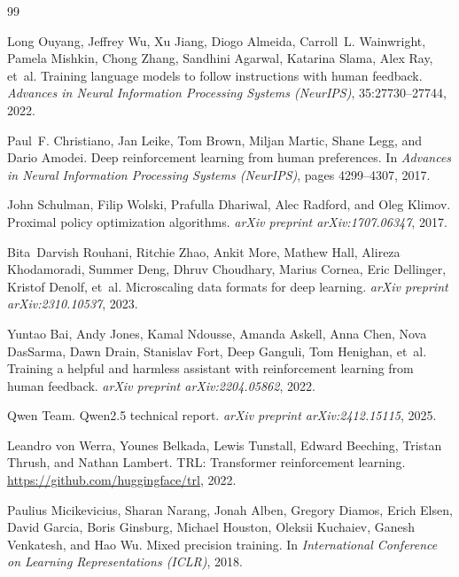 \documentclass[11pt,a4paper]{article}
\begin{document}

\begin{thebibliography}{99}

Long Ouyang, Jeffrey Wu, Xu Jiang, Diogo Almeida, Carroll~L. Wainwright, Pamela Mishkin, Chong Zhang, Sandhini Agarwal, Katarina Slama, Alex Ray, et~al.
Training language models to follow instructions with human feedback.
\emph{Advances in Neural Information Processing Systems (NeurIPS)}, 35:27730--27744, 2022.

Paul~F. Christiano, Jan Leike, Tom Brown, Miljan Martic, Shane Legg, and Dario Amodei.
Deep reinforcement learning from human preferences.
In \emph{Advances in Neural Information Processing Systems (NeurIPS)}, pages 4299--4307, 2017.

John Schulman, Filip Wolski, Prafulla Dhariwal, Alec Radford, and Oleg Klimov.
Proximal policy optimization algorithms.
\emph{arXiv preprint arXiv:1707.06347}, 2017.

Bita~Darvish Rouhani, Ritchie Zhao, Ankit More, Mathew Hall, Alireza Khodamoradi, Summer Deng, Dhruv Choudhary, Marius Cornea, Eric Dellinger, Kristof Denolf, et~al.
Microscaling data formats for deep learning.
\emph{arXiv preprint arXiv:2310.10537}, 2023.

Yuntao Bai, Andy Jones, Kamal Ndousse, Amanda Askell, Anna Chen, Nova DasSarma, Dawn Drain, Stanislav Fort, Deep Ganguli, Tom Henighan, et~al.
Training a helpful and harmless assistant with reinforcement learning from human feedback.
\emph{arXiv preprint arXiv:2204.05862}, 2022.

Qwen Team.
Qwen2.5 technical report.
\emph{arXiv preprint arXiv:2412.15115}, 2025.

Leandro von Werra, Younes Belkada, Lewis Tunstall, Edward Beeching, Tristan Thrush, and Nathan Lambert.
TRL: Transformer reinforcement learning.
\url{https://github.com/huggingface/trl}, 2022.

Paulius Micikevicius, Sharan Narang, Jonah Alben, Gregory Diamos, Erich Elsen, David Garcia, Boris Ginsburg, Michael Houston, Oleksii Kuchaiev, Ganesh Venkatesh, and Hao Wu.
Mixed precision training.
In \emph{International Conference on Learning Representations (ICLR)}, 2018.


\end{thebibliography}
\end{document}
